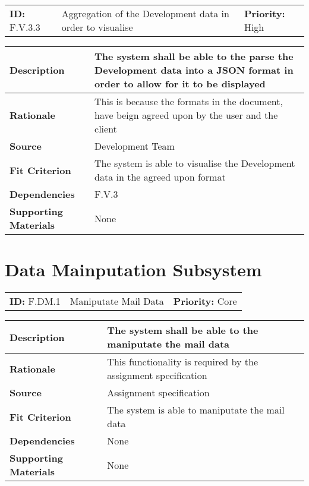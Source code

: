 \begin{table}[H]
    \begin{tabularx}{\textwidth}{| l | X | l |}
        \hline
        \textbf{ID:} F.V.3.3 & Aggregation of the Development data in order to visualise & \textbf{Priority:} High \\
    \end{tabularx}
    \begin{tabularx}{\textwidth}{| l | X |}
        \hline
        \textbf{Description} & The system shall be able to the parse the Development data into a JSON format in order to allow for it to be displayed\\ \hline
        \textbf{Rationale} & This is because the formats in the document, have beign agreed upon by the user and the client\\ \hline
        \textbf{Source} & Development Team\\ \hline
        \textbf{Fit Criterion} & The system is able to visualise the Development data in the agreed upon format\\ \hline
        \textbf{Dependencies} & F.V.3 \\ \hline
        \textbf{Supporting Materials} & None \\ \hline
    \end{tabularx}
\end{table}

\section{Data Mainputation Subsystem}


\begin{table}[H]
    \begin{tabularx}{\textwidth}{| l | X | l |}
        \hline
        \textbf{ID:} F.DM.1 & Maniputate Mail Data & \textbf{Priority:} Core \\
    \end{tabularx}
    \begin{tabularx}{\textwidth}{| l | X |}
        \hline
        \textbf{Description} & The system shall be able to the maniputate the mail data \\ \hline
        \textbf{Rationale} & This functionality is required by the assignment specification\\ \hline
        \textbf{Source} & Assignment specification\\ \hline
        \textbf{Fit Criterion} & The system is able to maniputate the mail data\\ \hline
        \textbf{Dependencies} & None \\ \hline
        \textbf{Supporting Materials} & None \\ \hline
    \end{tabularx}
\end{table}

